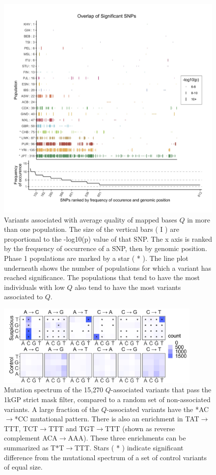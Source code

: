 \documentclass[9pt,lineno]{template}
\begin{document}
\begin{figure}
\includegraphics[width=\hsize,keepaspectratio]{../Figures/SNPOverlap6.jpg}

\caption{Variants associated with average quality of mapped bases $Q$ in more than one population.
The size of the vertical bars ( I ) are proportional to the -log10(p) value of that SNP.
The x axis is ranked by the frequency of occurrence of a SNP, then by genomic position.
Phase 1 populations are marked by a star ( * ).
The line plot underneath shows the number of populations for which a variant has reached significance.
The populations that tend to have the most individuals with low $Q$ also tend to have the most variants associated to $Q$.}
  \label{OverLap}
\end{figure}

\begin{figure}[tbp]
\centering
\includegraphics[width=10cm,keepaspectratio]{../Figures/strict_gcat_mutational_enrichment.jpg}
\caption{Mutation spectrum of the 15,270 $Q$-associated variants that pass the 1kGP strict mask filter, compared to a random set of non-associated variants. A large fraction of the  $Q$-associated variants have the *AC${\rightarrow}$*CC mutational pattern. There is also an enrichment in TAT${\rightarrow}$TTT, TCT${\rightarrow}$TTT and  TGT${\rightarrow}$TTT (shown as reverse complement  ACA${\rightarrow}$AAA). These three enrichments can be summarized as T*T${\rightarrow}$TTT. Stars ( * ) indicate significant difference from the mutational spectrum of a set of control variants of equal size.}  
\label{strict_gcat_mutational_enrichment}
\end{figure}
\end{document}
